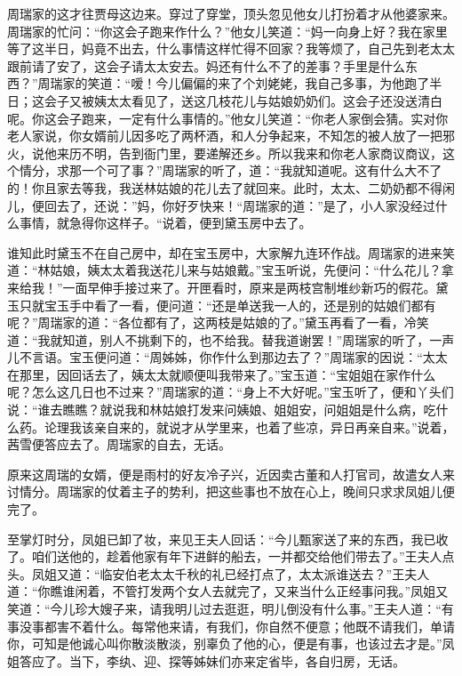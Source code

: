 \documentclass[12pt,oneside]{book}
\begin{document}
周瑞家的这才往贾母这边来。穿过了穿堂，顶头忽见他女儿打扮着才从他婆家来。周瑞家的忙问：“你这会子跑来作什么？”他女儿笑道：“妈一向身上好？我在家里等了这半日，妈竟不出去，什么事情这样忙得不回家？我等烦了，自己先到老太太跟前请了安了，这会子请太太安去。妈还有什么不了的差事？手里是什么东西？”周瑞家的笑道：“嗳！今儿偏偏的来了个刘姥姥，我自己多事，为他跑了半日；这会子又被姨太太看见了，送这几枝花儿与姑娘奶奶们。这会子还没送清白呢。你这会子跑来，一定有什么事情的。”他女儿笑道：“你老人家倒会猜。实对你老人家说，你女婿前儿因多吃了两杯酒，和人分争起来，不知怎的被人放了一把邪火，说他来历不明，告到衙门里，要递解还乡。所以我来和你老人家商议商议，这个情分，求那一个可了事？”周瑞家的听了，道：“我就知道呢。这有什么大不了的！你且家去等我，我送林姑娘的花儿去了就回来。此时，太太、二奶奶都不得闲儿，便回去了，还说：”妈，你好歹快来！“周瑞家的道：”是了，小人家没经过什么事情，就急得你这样子。“说着，便到黛玉房中去了。

谁知此时黛玉不在自己房中，却在宝玉房中，大家解九连环作战。周瑞家的进来笑道：“林姑娘，姨太太着我送花儿来与姑娘戴。”宝玉听说，先便问：“什么花儿？拿来给我！”一面早伸手接过来了。开匣看时，原来是两枝宫制堆纱新巧的假花。黛玉只就宝玉手中看了一看，便问道：“还是单送我一人的，还是别的姑娘们都有呢？”周瑞家的道：“各位都有了，这两枝是姑娘的了。”黛玉再看了一看，冷笑道：“我就知道，别人不挑剩下的，也不给我。替我道谢罢！”周瑞家的听了，一声儿不言语。宝玉便问道：“周姊姊，你作什么到那边去了？”周瑞家的因说：“太太在那里，因回话去了，姨太太就顺便叫我带来了。”宝玉道：“宝姐姐在家作什么呢？怎么这几日也不过来？”周瑞家的道：“身上不大好呢。”宝玉听了，便和丫头们说：“谁去瞧瞧？就说我和林姑娘打发来问姨娘、姐姐安，问姐姐是什么病，吃什么药。论理我该亲自来的，就说才从学里来，也着了些凉，异日再亲自来。”说着，茜雪便答应去了。周瑞家的自去，无话。

原来这周瑞的女婿，便是雨村的好友冷子兴，近因卖古董和人打官司，故遣女人来讨情分。周瑞家的仗着主子的势利，把这些事也不放在心上，晚间只求求凤姐儿便完了。

至掌灯时分，凤姐已卸了妆，来见王夫人回话：“今儿甄家送了来的东西，我已收了。咱们送他的，趁着他家有年下进鲜的船去，一并都交给他们带去了。”王夫人点头。凤姐又道：“临安伯老太太千秋的礼已经打点了，太太派谁送去？”王夫人道：“你瞧谁闲着，不管打发两个女人去就完了，又来当什么正经事问我。”凤姐又笑道：“今儿珍大嫂子来，请我明儿过去逛逛，明儿倒没有什么事。”王夫人道：“有事没事都害不着什么。每常他来请，有我们，你自然不便意；他既不请我们，单请你，可知是他诚心叫你散淡散淡，别辜负了他的心，便是有事，也该过去才是。”凤姐答应了。当下，李纨、迎、探等姊妹们亦来定省毕，各自归房，无话。
\end{document}
